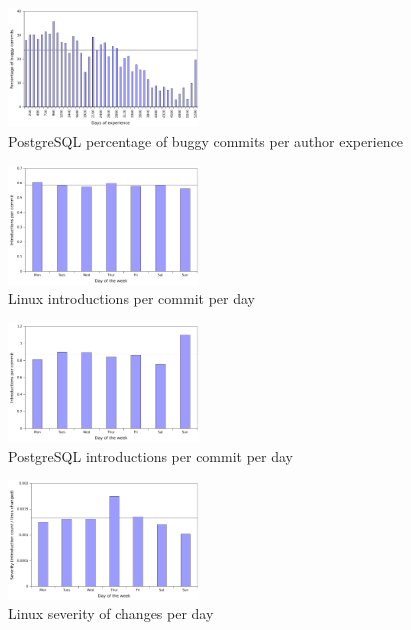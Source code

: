 \begin{figure}
\begin{center}
\includegraphics[width=0.45\textwidth]{postgresql-bugginess-experience.pdf}
\end{center}
\caption{PostgreSQL percentage of buggy commits per author experience}
\label{fig-postgresql-bugginess-experience}
\end{figure}


\begin{figure}
\begin{center}
\includegraphics[width=0.45\textwidth]{linux-introductions-day.pdf}
\end{center}
\caption{Linux introductions per commit per day}
\label{fig-linux-introductions-day}
\end{figure}

\begin{figure}
\begin{center}
\includegraphics[width=0.45\textwidth]{postgresql-introductions-day.pdf}
\end{center}
\caption{PostgreSQL introductions per commit per day}
\label{fig-postgresql-introductions-day}
\end{figure}

\begin{figure}
\begin{center}
\includegraphics[width=0.45\textwidth]{linux-severity-day.pdf}
\end{center}
\caption{Linux severity of changes per day}
\label{fig-linux-severity-day}
\end{figure}

